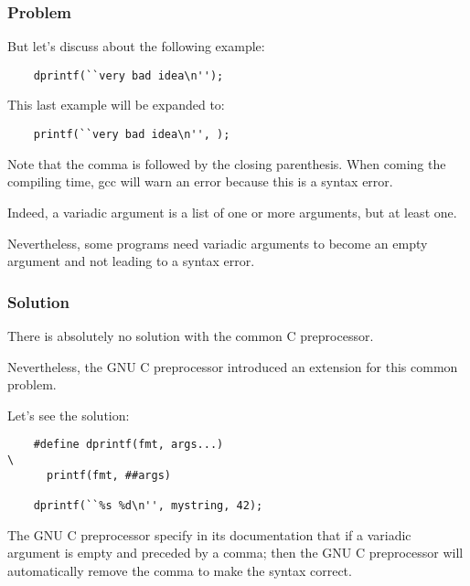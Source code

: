 \documentclass[8pt]{beamer}
\newcommand{\nl}[0]{\vspace{0.4cm}}
\begin{document}

\begin{frame}[containsverbatim]
  \frametitle{Problem}

  But let's discuss about the following example:

  \begin{verbatim}
    dprintf(``very bad idea\n'');
  \end{verbatim}

  This last example will be expanded to:

  \begin{verbatim}
    printf(``very bad idea\n'', );
  \end{verbatim}

  Note that the comma is followed by the closing parenthesis. When coming
  the compiling time, gcc will warn an error because this is a syntax
  error.

  \nl

  Indeed, a variadic argument is a list of one or more arguments, but at
  least one.

  \nl

  Nevertheless, some programs need variadic arguments to become an empty
  argument and not leading to a syntax error.
\end{frame}


\begin{frame}[containsverbatim]
  \frametitle{Solution}

  There is absolutely no solution with the common C preprocessor.

  \nl

  Nevertheless, the GNU C preprocessor introduced an extension for
  this common problem.

  \nl

  Let's see the solution:

  \begin{verbatim}
    #define dprintf(fmt, args...)                                       \
      printf(fmt, ##args)

    dprintf(``%s %d\n'', mystring, 42);
  \end{verbatim}

  The GNU C preprocessor specify in its documentation that if a variadic
  argument is empty and preceded by a comma; then the GNU C preprocessor will
  automatically remove the comma to make the syntax correct.
\end{frame}

%
%
\end{document}

